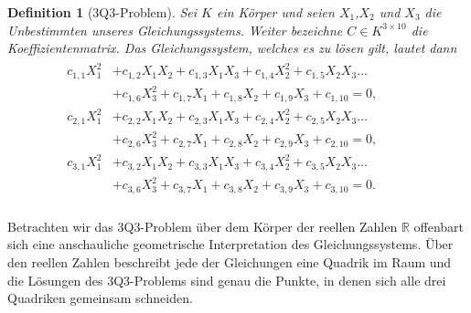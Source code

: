 \documentclass[a4paper,oneside, 11pt, openany%
]{article}
\newcommand{\R}{{\mathbb R}}
\theoremstyle{custom}
\theoremstyle{custom}
\newtheorem{definition}[theorem]{Definition}
\begin{document}
	\begin{definition}[3Q3-Problem]\label{def:3Q3}
		Sei $K$ ein Körper und seien $X_1$,$X_{2}$ und $X_{3}$ die Unbestimmten unseres Gleichungssystems. Weiter bezeichne $C \in K^{3\times 10}$ die Koeffizientenmatrix. Das Gleichungssystem, welches es zu lösen gilt, lautet dann
		\begin{gather}\label{eqn:3Q3}
			\begin{alignedat}{4}
				c_{1,1}X_{1}^2&+c_{1,2}X_{1}X_{2}+c_{1,3}X_{1}X_{3}+c_{1,4}X_{2}^2+c_{1,5}X_{2}X_{3}\ldots&&&\\&+c_{1,6}X_{3}^2+c_{1,7}X_{1}+c_{1,8}X_{2}+c_{1,9}X_{3}+c_{1,10}=0,\\
				c_{2,1}X_{1}^2&+c_{2,2}X_{1}X_{2}+c_{2,3}X_{1}X_{3}+c_{2,4}X_{2}^2+c_{2,5}X_{2}X_{3}\ldots&&&\\&+c_{2,6}X_{3}^2+c_{2,7}X_{1}+c_{2,8}X_{2}+c_{2,9}X_{3}+c_{2,10}=0,\\
				c_{3,1}X_{1}^2&+c_{3,2}X_{1}X_{2}+c_{3,3}X_{1}X_{3}+c_{3,4}X_{2}^2+c_{3,5}X_{2}X_{3}\ldots&&&\\&+c_{3,6}X_{3}^2+c_{3,7}X_{1}+c_{3,8}X_{2}+c_{3,9}X_{3}+c_{3,10}=0.\\
			\end{alignedat}
		\end{gather}
	\end{definition}
	Betrachten wir das 3Q3-Problem über dem Körper der reellen Zahlen $\R$ offenbart sich eine anschauliche geometrische Interpretation des Gleichungssystems. Über den reellen Zahlen beschreibt jede der Gleichungen eine Quadrik im Raum und die Lösungen des 3Q3-Problems sind genau die Punkte, in denen sich alle drei Quadriken gemeinsam schneiden.
	
\end{document}
